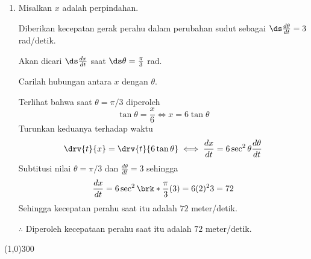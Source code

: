 \begin{enumerate}[leftmargin=*, label={\arabic*}.]
\item Misalkan $x$ adalah perpindahan. 

Diberikan kecepatan gerak perahu dalam perubahan sudut 
sebagai $\ds\frac{d\theta}{dt} = 3$ rad/detik. 

Akan dicari $\ds\frac{dx}{dt}$ saat 
$\ds\theta = \frac{\pi}{3}$ rad.

Carilah hubungan antara $x$ dengan $\theta$.
\vspace{0.2cm}
\begin{center}
\end{center}
Terlihat bahwa saat $\theta = \pi/3$ diperoleh
\[
\tan \theta = \frac{x}{6} \iff x = 6\tan\theta
\]
Turunkan keduanya terhadap waktu
\[
\drv{t}{x} = \drv{t}{6\tan\theta} \iff \frac{dx}{dt} = 6\sec^{2}\theta\frac{d\theta}{dt}
\]
Subtitusi nilai $\theta = \pi/3$ dan $\frac{d\theta}{dt}=3$ sehingga
\[
\frac{dx}{dt} = 6\sec^{2}\brk*{\frac{\pi}{3}}(3) = 6(2)^{2}3 = 72
\]
Sehingga kecepatan perahu saat itu adalah $72$ meter/detik.

$\therefore$ Diperoleh kecepataan perahu saat itu adalah $72$ meter/detik.

\end{enumerate}

\begin{center}
    \line(1,0){300}
\end{center}